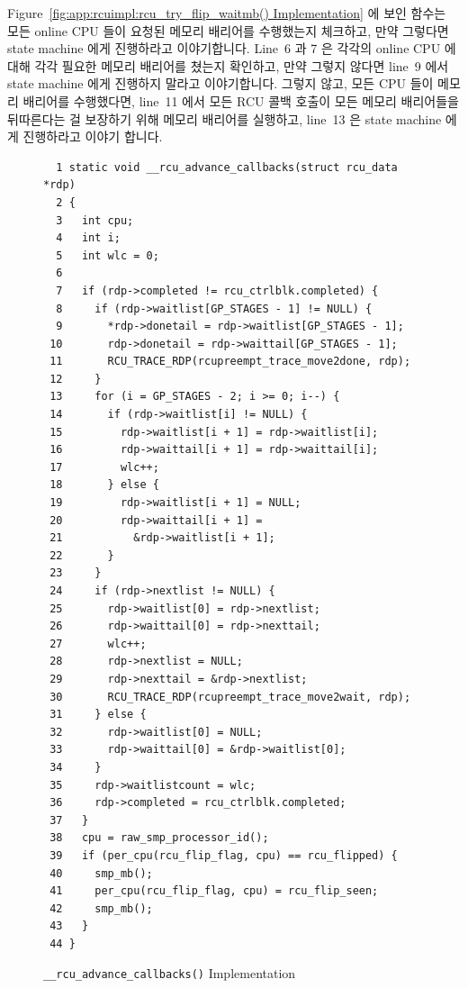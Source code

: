 Figure~\ref{fig:app:rcuimpl:rcu_try_flip_waitmb() Implementation}
에 보인  함수는 모든 online CPU 들이 요청된 메모리
배리어를 수행했는지 체크하고, 만약 그렇다면 state machine 에게 진행하라고
이야기합니다.
Line~6 과 7 은 각각의 online CPU 에 대해 각각 필요한 메모리 배리어를 쳤는지
확인하고, 만약 그렇지 않다면 line~9 에서 state machine 에게 진행하지 말라고
이야기합니다.
그렇지 않고, 모든 CPU 들이 메모리 배리어를 수행했다면, line~11 에서 모든 RCU
콜백 호출이 모든 메모리 배리어들을 뒤따른다는 걸 보장하기 위해 메모리 배리어를
실행하고, line~13 은 state machine 에게 진행하라고 이야기 합니다.

\begin{figure}[tbp]
{ \scriptsize
\begin{verbatim}
  1 static void __rcu_advance_callbacks(struct rcu_data *rdp)
  2 {
  3   int cpu;
  4   int i;
  5   int wlc = 0;
  6
  7   if (rdp->completed != rcu_ctrlblk.completed) {
  8     if (rdp->waitlist[GP_STAGES - 1] != NULL) {
  9       *rdp->donetail = rdp->waitlist[GP_STAGES - 1];
 10       rdp->donetail = rdp->waittail[GP_STAGES - 1];
 11       RCU_TRACE_RDP(rcupreempt_trace_move2done, rdp);
 12     }
 13     for (i = GP_STAGES - 2; i >= 0; i--) {
 14       if (rdp->waitlist[i] != NULL) {
 15         rdp->waitlist[i + 1] = rdp->waitlist[i];
 16         rdp->waittail[i + 1] = rdp->waittail[i];
 17         wlc++;
 18       } else {
 19         rdp->waitlist[i + 1] = NULL;
 20         rdp->waittail[i + 1] =
 21           &rdp->waitlist[i + 1];
 22       }
 23     }
 24     if (rdp->nextlist != NULL) {
 25       rdp->waitlist[0] = rdp->nextlist;
 26       rdp->waittail[0] = rdp->nexttail;
 27       wlc++;
 28       rdp->nextlist = NULL;
 29       rdp->nexttail = &rdp->nextlist;
 30       RCU_TRACE_RDP(rcupreempt_trace_move2wait, rdp);
 31     } else {
 32       rdp->waitlist[0] = NULL;
 33       rdp->waittail[0] = &rdp->waitlist[0];
 34     }
 35     rdp->waitlistcount = wlc;
 36     rdp->completed = rcu_ctrlblk.completed;
 37   }
 38   cpu = raw_smp_processor_id();
 39   if (per_cpu(rcu_flip_flag, cpu) == rcu_flipped) {
 40     smp_mb();
 41     per_cpu(rcu_flip_flag, cpu) = rcu_flip_seen;
 42     smp_mb();
 43   }
 44 }
\end{verbatim}
}
\caption{{\tt \_\_rcu\_advance\_callbacks()} Implementation}
\label{fig:app:rcuimpl:__rcu_advance_callbacks() Implementation}
\end{figure}

